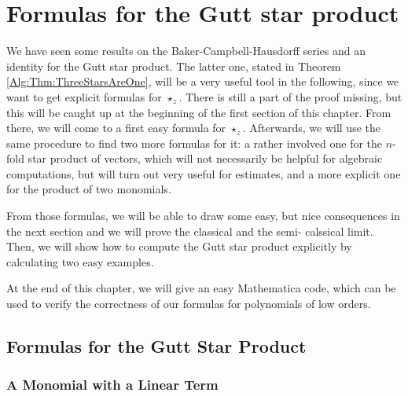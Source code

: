 
%
%

\chapter{Formulas for the Gutt star product}

We have seen some results on the Baker-Campbell-Hausdorff series and an 
identity for the Gutt star product. The latter one, stated in Theorem 
\ref{Alg:Thm:ThreeStarsAreOne}, will be a very useful tool in the following, 
since we want to get explicit formulas for $\star_z$. There is still a part of 
the proof missing, but this will be caught up at the beginning of the first 
section of this chapter. From there, we will come to a first easy formula for 
$\star_z$. Afterwards, we will use the same procedure to find two more 
formulas for it: a rather involved one for the $n$-fold star product of 
vectors, which will not necessarily be helpful for algebraic computations, 
but will turn out very useful for estimates, and a more explicit one for the 
product of two monomials.

From those formulas, we will be able to draw some easy, but nice 
consequences in the next section and we will prove the classical and the semi-
calssical limit. Then, we will show how to compute the Gutt star product 
explicitly by calculating two easy examples.

At the end of this chapter, we will give an easy Mathematica code, which 
can be used to verify the correctness of our formulas for polynomials of low 
orders.



\section{Formulas for the Gutt Star Product}
\label{sec:chap4_Formulas}


%
%

\subsection{A Monomial with a Linear Term}

